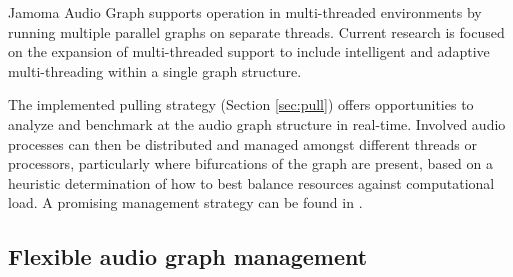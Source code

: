 \documentclass[twoside,a4paper]{article}
\begin{document}
Jamoma Audio Graph supports operation in multi-threaded environments by running multiple parallel graphs on separate threads.  Current research is focused on the expansion of multi-threaded support to include intelligent and adaptive multi-threading within a single graph structure.  

The implemented pulling strategy (Section \ref{sec:pull}) offers opportunities to analyze and benchmark at the audio graph structure in real-time.  Involved audio processes can then be distributed and managed amongst different threads or processors, particularly where bifurcations of the graph are present, based on a heuristic determination of how to best balance resources against computational load.  A promising management strategy can be found in \cite{PartzschAES122}.





%   



\subsection{Flexible audio graph management} %
\end{document}
